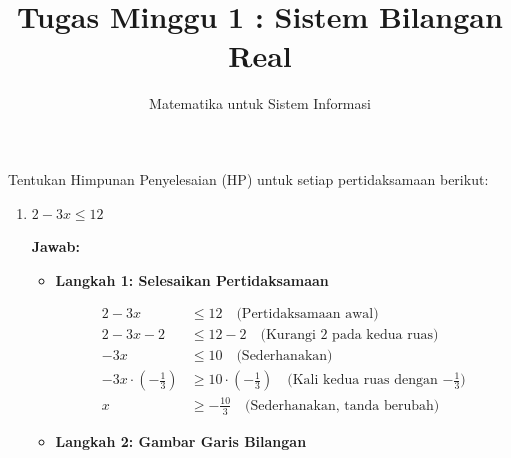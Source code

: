 \documentclass[10pt,a4paper]{article}
\title{Tugas Minggu 1 : Sistem Bilangan Real}
\author{Matematika untuk Sistem Informasi}
\date{}
\newcounter{eqblock}
\newcommand{\reseteq}{%
  \stepcounter{eqblock}%
  \setcounter{equation}{0}%
  \renewcommand{\theHequation}{\arabic{eqblock}.\arabic{equation}}%
}
\begin{document}
\maketitle

Tentukan Himpunan Penyelesaian (HP) untuk setiap pertidaksamaan berikut:

\begin{enumerate}

\item $2 - 3x \leq 12$

\textbf{Jawab:}

\begin{itemize}
\item \textbf{Langkah 1: Selesaikan Pertidaksamaan}

\reseteq

\begin{align}
2 - 3x &\leq 12 \quad \text{(Pertidaksamaan awal)} \\
2 - 3x - 2 &\leq 12 - 2 \quad \text{(Kurangi 2 pada kedua ruas)} \\
-3x &\leq 10 \quad \text{(Sederhanakan)} \\
-3x \cdot \left(-\frac{1}{3}\right) &\geq 10 \cdot \left(-\frac{1}{3}\right) \quad \text{(Kali kedua ruas dengan $-\frac{1}{3}$)} \\
x &\geq -\frac{10}{3} \quad \text{(Sederhanakan, tanda berubah)}
\end{align}

\item \textbf{Langkah 2: Gambar Garis Bilangan}

\begin{center}
\end{center}


\end{itemize}
\end{enumerate}
\end{document}

